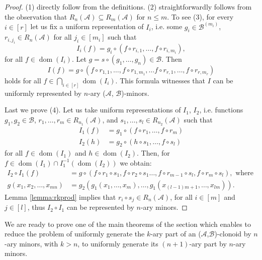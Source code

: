 \documentclass[11pt]{amsart}
\theoremstyle{plain}
\theoremstyle{definition}
\DeclareMathOperator{\dom}{dom}
\newcommand{\clone}[1]{\mathcal{#1}}
\newcommand{\cloA}{\clone{A}}
\newcommand{\cloB}{\clone{B}}
\begin{document}
\begin{proof}
(1) directly follow from the definitions. (2) straightforwardly follows from the observation that $R_n(\cloA) \subseteq R_m(\cloA)$ for $n \leq m$. To see (3), for every $i \in [r]$ let us fix a uniform representation of $I_i$, i.e. some $g_i \in \cloB^{(m_i)}$, $r_{i,j_i} \in R_n(\cloA)$ for all $j_i \in [m_i]$ such that
\begin{equation*}
  I_i(f) = g_i \circ (f \circ r_{i,1},\ldots, f \circ r_{i,m_i}),   
\end{equation*}
for all $f \in \dom(I_i)$. Let $g = s \circ (g_1,\dots,g_n) \in \cloB$. Then
\begin{equation*}
  I(f) = g \circ (f \circ r_{1,1},\ldots, f \circ r_{1,m_1}, \ldots f \circ r_{r,1},\ldots, f \circ r_{r,m_r})   
\end{equation*}
holds for all $f \in \bigcap_{i \in [r]} \dom(I_i)$. This formula witnesses that $I$ can be uniformly represented by $n$-ary ($\cloA$, $\cloB$)-minors.

Last we prove (4). Let us take uniform representations of $I_1$, $I_2$, i.e. functions $g_1,g_2 \in\cloB$, $r_1,\ldots,r_m \in R_{n_1}(\cloA)$, and $s_1,\ldots,s_l \in R_{n_2}(\cloA)$ such that
\begin{align*}
I_1(f) &= g_1 \circ (f \circ r_1,\ldots, f \circ r_{m}) \\
I_2(h) &= g_2 \circ (h \circ s_1,\ldots, f \circ s_{l}) 
\end{align*}
for all $f \in \dom(I_1)$ and $h \in \dom(I_2)$. Then, for $f \in \dom(I_1) \cap I_1^{-1}(\dom(I_2))$ we obtain:
\begin{align*}
I_2 \circ I_1(f) &= g \circ (f \circ r_1 \circ s_1, f \circ r_2 \circ s_1 \ldots, f \circ r_{m-1} \circ s_{l}, f \circ r_m \circ s_l), \text{ where } \\
g(x_1,x_2,\ldots,x_{mn}) &= g_2(g_1(x_1,\ldots,x_m),\ldots, g_1(x_{(l-1)m+1},\ldots, x_{lm})).
\end{align*}
Lemma \ref{lemma:rkprod} implies that $r_i\circ s_j \in R_n(\cloA)$, for all $i \in [m]$ and $j \in [l]$, thus $I_2 \circ I_1$ can be represented by $n$-ary minors.
\end{proof}

We are ready to prove one of the main theorems of the section which enables to reduce the problem of uniformly generate the $k$-ary part of an ($\cloA$,$\cloB$)-clonoid by $n$-ary minors, with $k>n$, to uniformly generate its $(n+1)$-ary part by $n$-ary minors.
\end{document}
